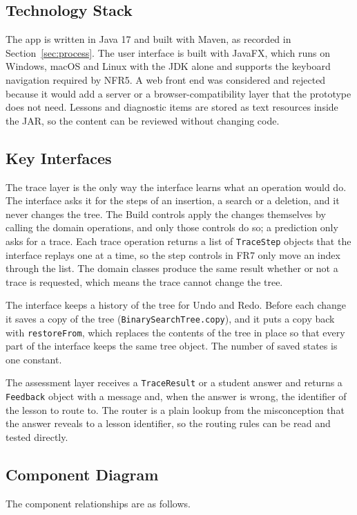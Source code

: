 \subsection{Technology Stack}
The app is written in Java 17 and built with Maven, as recorded in Section~\ref{sec:process}. The user interface is built with JavaFX, which runs on Windows, macOS and Linux with the JDK alone and supports the keyboard navigation required by NFR5. A web front end was considered and rejected because it would add a server or a browser-compatibility layer that the prototype does not need. Lessons and diagnostic items are stored as text resources inside the JAR, so the content can be reviewed without changing code. 

\subsection{Key Interfaces}
The trace layer is the only way the interface learns what an operation would do. The interface asks it for the steps of an insertion, a search or a deletion, and it never changes the tree. The Build controls apply the changes themselves by calling the domain operations, and only those controls do so; a prediction only asks for a trace. Each trace operation returns a list of \texttt{TraceStep} objects that the interface replays one at a time, so the step controls in FR7 only move an index through the list. The domain classes produce the same result whether or not a trace is requested, which means the trace cannot change the tree.

The interface keeps a history of the tree for Undo and Redo. Before each change it saves a copy of the tree (\texttt{BinarySearchTree.copy}), and it puts a copy back with \texttt{restoreFrom}, which replaces the contents of the tree in place so that every part of the interface keeps the same tree object. The number of saved states is one constant.

The assessment layer receives a \texttt{TraceResult} or a student answer and returns a \texttt{Feedback} object with a message and, when the answer is wrong, the identifier of the lesson to route to. The router is a plain lookup from the misconception that the answer reveals to a lesson identifier, so the routing rules can be read and tested directly.

\subsection{Component Diagram}
The component relationships are as follows.

